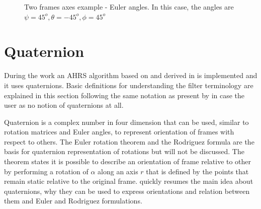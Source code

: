 \begin{figure}[!hbt]
	\caption[Two frames axes example - Euler angles]{Two frames axes example - Euler angles. In this case, the angles are $\psi=45^o, \theta=-45^o, \phi=45^o$}
	\label{fig:frame_axis_example_euler}
\end{figure}

\section{Quaternion} \label{section:quaternion}

During the work an \gls{AHRS} algorithm based on \cite{Madgwick2010_report} and derived in \cite{thesis_BT} is implemented  and it uses quaternions. Basic definitions for understanding the filter terminology  are explained in this section following the same notation as present by \cite{thesis_BT} in case the user as no notion of quaternions at all.

Quaternion is a complex number in four dimension that can be used, similar to rotation matrices and Euler angles, to represent orientation of frames with respect to others. The Euler rotation theorem and the Rodriguez formula are the basis for quaternion representation of rotations but will not be discussed. The theorem states it is possible to describe an orientation of frame relative to other by performing a rotation of $\alpha$ along an axis $r$ that is defined by the points that remain static relative to the original frame. \cite{quaternions} quickly resumes the main idea about quaternions, why they can be used to express orientations and relation between them and Euler and Rodriguez formulations. 

